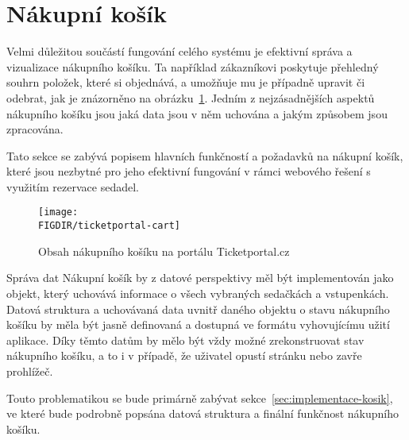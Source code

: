 \section{Nákupní košík}
\label{sec:identifikace-nakupni-kosik}
Velmi důležitou součástí fungování celého systému je efektivní správa a vizualizace nákupního košíku.
Ta například zákazníkovi poskytuje přehledný souhrn položek, které si objednává, a umožňuje mu je případně upravit či odebrat, jak je znázorněno na obrázku~\ref{fig:ticketportal-cart}.
Jedním z nejzásadnějších aspektů nákupního košíku jsou jaká data jsou v něm uchována a jakým způsobem jsou zpracována.

Tato sekce se zabývá popisem hlavních funkčností a požadavků na nákupní košík, které jsou nezbytné pro jeho efektivní fungování v rámci webového řešení s využitím rezervace sedadel.

\begin{figure}[H]
    \texttt{[image: \\FIGDIR/ticketportal-cart]}
    \centering
    \caption{Obsah nákupního košíku na portálu Ticketportal.cz\cite{t__www_ticketportal_cz}}
    \label{fig:ticketportal-cart}
\end{figure}

\begin{subsection}{Správa dat}
    \label{subsec:identifikace-nakupni-kosik-sprava}
    Nákupní košík by z datové perspektivy měl být implementován jako objekt, který uchovává informace o všech vybraných sedačkách a vstupenkách.
    Datová struktura a uchovávaná data uvnitř daného objektu o stavu nákupního košíku by měla být jasně definovaná a dostupná ve formátu vyhovujícímu užití aplikace.
    Díky těmto datům by mělo být vždy možné zrekonstruovat stav nákupního košíku, a to i v případě, že uživatel opustí stránku nebo zavře prohlížeč.

    Touto problematikou se bude primárně zabývat sekce~\ref{sec:implementace-kosik}, ve které bude podrobně popsána datová struktura a finální funkčnost nákupního košíku.
\end{subsection}

